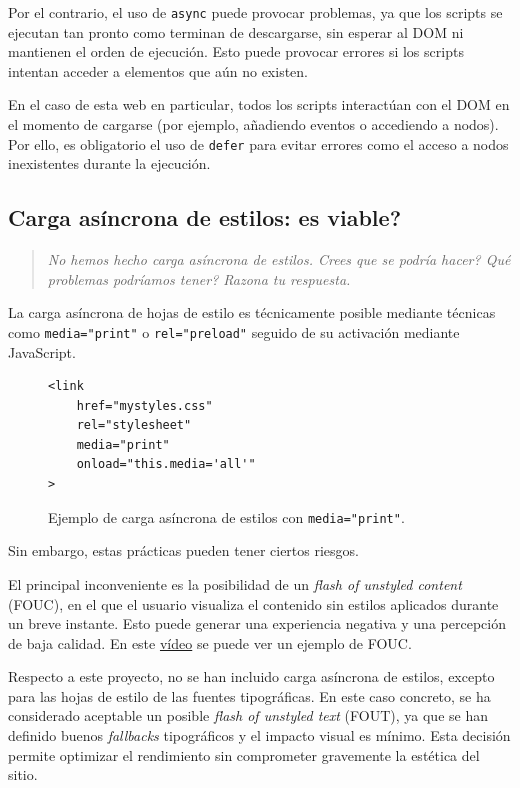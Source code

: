 \documentclass{article}
\begin{document}
Por el contrario, el uso de \texttt{async} puede provocar problemas, ya que los scripts se ejecutan tan pronto como terminan de descargarse, sin esperar al DOM ni mantienen el orden de ejecución. Esto puede provocar errores si los scripts intentan acceder a elementos que aún no existen.

En el caso de esta web en particular, todos los scripts interactúan con el DOM en el momento de cargarse (por ejemplo, añadiendo eventos o accediendo a nodos). Por ello, es obligatorio el uso de \texttt{defer} para evitar errores como el acceso a nodos inexistentes durante la ejecución.

\subsection{Carga asíncrona de estilos: \textquestiondown es viable?}\label{subsec:carga-asincrona-de-estilos}

\begin{quotation}
\textit{No hemos hecho carga asíncrona de estilos. \textquestiondown Crees que se podría hacer? \textquestiondown Qué problemas podríamos tener? Razona tu respuesta.}
\end{quotation}

La carga asíncrona de hojas de estilo es técnicamente posible mediante técnicas como \texttt{media="print"} o \texttt{rel="preload"} seguido de su activación mediante JavaScript. 

\begin{figure}[h!]
\begin{verbatim}
<link
    href="mystyles.css"
    rel="stylesheet"
    media="print"
    onload="this.media='all'"
>
\end{verbatim}
\caption{Ejemplo de carga asíncrona de estilos con \texttt{media="print"}.}
\label{fig:media-print}
\end{figure}

Sin embargo, estas prácticas pueden tener ciertos riesgos.

El principal inconveniente es la posibilidad de un \textit{flash of unstyled content} (FOUC), en el que el usuario visualiza el contenido sin estilos aplicados durante un breve instante. Esto puede generar una experiencia negativa y una percepción de baja calidad. En este \href{https://www.youtube.com/shorts/pXfxXVpg4Qk}{vídeo} se puede ver un ejemplo de FOUC.

Respecto a este proyecto, no se han incluido carga asíncrona de estilos, excepto para las hojas de estilo de las fuentes tipográficas. En este caso concreto, se ha considerado aceptable un posible \textit{flash of unstyled text} (FOUT), ya que se han definido buenos \textit{fallbacks} tipográficos y el impacto visual es mínimo. Esta decisión permite optimizar el rendimiento sin comprometer gravemente la estética del sitio.
\end{document}
